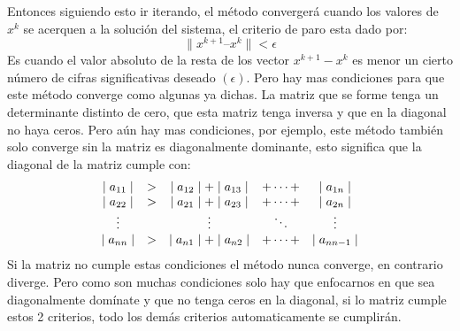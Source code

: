 \documentclass[12pt]{article}
\begin{document}
			Entonces siguiendo esto ir iterando, el método convergerá cuando los valores de $ x^k $ se acerquen a la 
			solución del sistema, el criterio de paro esta dado por:
			$$ \parallel x^{k+1} – x^k \parallel < \epsilon $$
			Es cuando el valor absoluto de la resta de los vector $ x^{k+1} - x^k $ es menor un cierto número de cifras 
			significativas deseado $ (\epsilon) $.
			Pero hay mas condiciones para que este método converge como algunas ya dichas. La matriz que se forme 
			tenga un determinante distinto de cero, que esta matriz tenga inversa y que en la diagonal no haya ceros. Pero 
			aún hay mas condiciones, por ejemplo, este método también solo converge sin la matriz es diagonalmente dominante, 
			esto significa que la diagonal de la matriz cumple con:
			$$
			\begin{array}{c c c c c c}
				\mid a_{11} \mid & > & \mid a_{12} \mid + \mid a_{13} \mid & + \dots + & \mid a_{1n} \mid \\
				\mid a_{22} \mid & > & \mid a_{21} \mid + \mid a_{23} \mid & + \dots + & \mid a_{2n} \mid \\
				\vdots &  & \vdots & \ddots & \vdots \\
				\mid a_{nn} \mid & > & \mid a_{n1} \mid + \mid a_{n2} \mid & + \dots + & \mid a_{nn-1} \mid 
			\end{array}
			$$
			Si la matriz no cumple estas condiciones el método nunca converge, en contrario diverge.
			Pero como son muchas condiciones solo hay que enfocarnos en que sea diagonalmente domínate y que no tenga ceros 
			en la diagonal, si lo matriz cumple estos 2 criterios, todo los demás criterios automaticamente se cumplirán.
\end{document}
